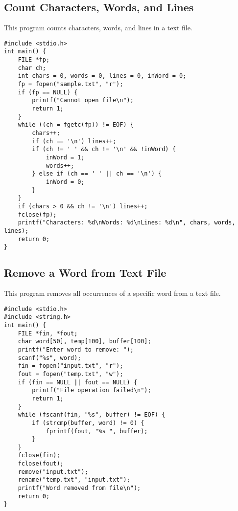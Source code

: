 \documentclass[a4paper,12pt]{article}
\begin{document}
\subsection{Count Characters, Words, and Lines}
This program counts characters, words, and lines in a text file.
\begin{lstlisting}[caption={Count Characters, Words, and Lines}]
#include <stdio.h>
int main() {
    FILE *fp;
    char ch;
    int chars = 0, words = 0, lines = 0, inWord = 0;
    fp = fopen("sample.txt", "r");
    if (fp == NULL) {
        printf("Cannot open file\n");
        return 1;
    }
    while ((ch = fgetc(fp)) != EOF) {
        chars++;
        if (ch == '\n') lines++;
        if (ch != ' ' && ch != '\n' && !inWord) {
            inWord = 1;
            words++;
        } else if (ch == ' ' || ch == '\n') {
            inWord = 0;
        }
    }
    if (chars > 0 && ch != '\n') lines++;
    fclose(fp);
    printf("Characters: %d\nWords: %d\nLines: %d\n", chars, words, lines);
    return 0;
}
\end{lstlisting}
\clearpage

\subsection{Remove a Word from Text File}
This program removes all occurrences of a specific word from a text file.
\begin{lstlisting}[caption={Remove a Word from Text File}]
#include <stdio.h>
#include <string.h>
int main() {
    FILE *fin, *fout;
    char word[50], temp[100], buffer[100];
    printf("Enter word to remove: ");
    scanf("%s", word);
    fin = fopen("input.txt", "r");
    fout = fopen("temp.txt", "w");
    if (fin == NULL || fout == NULL) {
        printf("File operation failed\n");
        return 1;
    }
    while (fscanf(fin, "%s", buffer) != EOF) {
        if (strcmp(buffer, word) != 0) {
            fprintf(fout, "%s ", buffer);
        }
    }
    fclose(fin);
    fclose(fout);
    remove("input.txt");
    rename("temp.txt", "input.txt");
    printf("Word removed from file\n");
    return 0;
}
\end{lstlisting}
\clearpage
\end{document}
